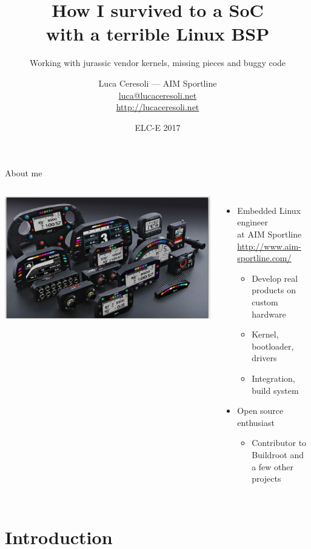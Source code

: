 \documentclass[xetex,table,aspectratio=169]{beamer}
\title{How I survived to a SoC\\with a terrible Linux BSP}
\subtitle{Working with jurassic vendor kernels, missing pieces and buggy code}
\author{Luca Ceresoli --- AIM Sportline\\
  \href{mailto:luca@lucaceresoli.net}{luca@lucaceresoli.net}\\
  \url{http://lucaceresoli.net}
}
\date{ELC-E 2017}
\begin{document}
\maketitle

\begin{frame}{About me}
  \begin{columns}
    \includegraphics[width=\textwidth]{../common/images/aim-products.jpg}

    \begin{itemize}
    \item Embedded Linux engineer\\
      at AIM Sportline\\
      {\footnotesize\url{http://www.aim-sportline.com/}}
      \begin{itemize}
      \item Develop real products on custom hardware
      \item Kernel, bootloader, drivers
      \item Integration, build system
      \end{itemize}
    \item Open source enthusiast
      \begin{itemize}
      \item Contributor to Buildroot and a few other projects
      \end{itemize}
    \end{itemize}
  \end{columns}
\end{frame}

\section{Introduction}
\end{document}

